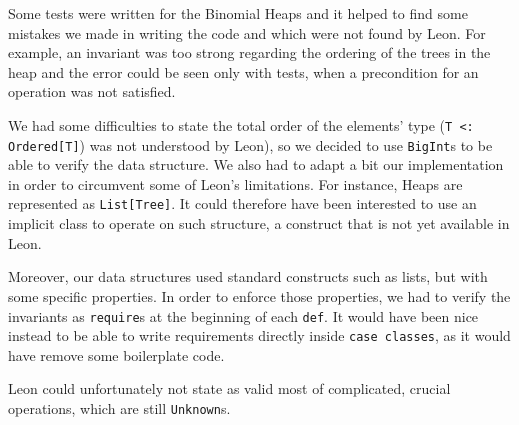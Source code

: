 Some tests were written for the Binomial Heaps and 
it helped to find some mistakes we made in writing the code and 
which were not found by Leon.
For example, an invariant was too strong regarding the ordering of the trees in the heap and 
the error could be seen only with tests,
when a precondition for an operation was not satisfied.

We had some difficulties to state the total order of the elements' type
(\texttt{T <: Ordered[T]}) was not understood by Leon), 
so we decided to use \verb|BigInt|s to be able to verify the data structure.
We also had to adapt a bit our implementation in order to circumvent some of Leon's limitations.
For instance, Heaps are represented as \texttt{List[Tree]}. It could therefore have been interested to use an implicit class to operate on such structure, a construct that is not yet available in Leon.

Moreover, our data structures used standard constructs such as lists, but with some specific properties. In order to enforce those properties, we had to verify the invariants as \texttt{require}s at the beginning of each \texttt{def}. It would have been nice instead to be able to write requirements directly inside \texttt{case classes}, as it would have remove some boilerplate code.

Leon could unfortunately not state as valid most of complicated, crucial operations, 
which are still \verb|Unknown|s.

